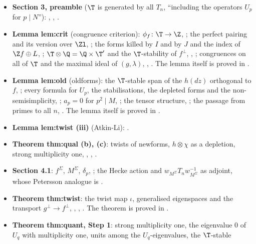 \begin{itemize}
\item \textbf{Section 3, preamble} ($\T$ is generated by all $T_n$, ``including the operators $U_p$ for $p\mid N$''): ,
, .
\item \textbf{Lemma lem:crit} (congruence criterion): $\phi_f\colon\T\to\Z$, ; the perfect pairing and its version over $\Zl$,
; the forms killed by $I$ and by $J$ and the index of $\Z f\oplus L$, ; $\T\otimes\Q=\Q\times\T'$ and the
$\T$-stability of $f^\perp$, , ; congruences on all of $\T$ and the maximal ideal of $(g,\lambda)$,
, . The lemma itself is proved in .
\item \textbf{Lemma lem:old} (oldforms): the $\T$-stable span of the $h(dz)$ orthogonal to $f$, ; every formula for $U_p$, the stabilisations, the
depleted forms and the non-semisimplicity, ; $a_p=0$ for $p^2\mid M$, ; the tensor structure,
; the passage from primes to all $n$, . The lemma itself is proved in .
\item \textbf{Lemma lem:twist (iii)} (Atkin-Li): .
\item \textbf{Theorem thm:qual (b), (c)}: twists of newforms, $h\otimes\chi$ as a depletion, strong multiplicity one, ,
, .
\item \textbf{Section 4.1}: $f^\Sigma$, $M^\Sigma$, $\delta_p$, ; the Hecke action and $w_{M^\Sigma}T_nw_{M^\Sigma}^{-1}$ as adjoint, whose Petersson
analogue is .
\item \textbf{Theorem thm:twist}: the twist map $\iota$, generalised eigenspaces and the transport $g^\perp\to f^\perp$, ,
, . The theorem is proved in .
\item \textbf{Theorem thm:quant, Step 1}: strong multiplicity one, the eigenvalue $0$ of $U_q$ with multiplicity one, units among the $U_q$-eigenvalues, the $\T$-stable

\end{itemize}
